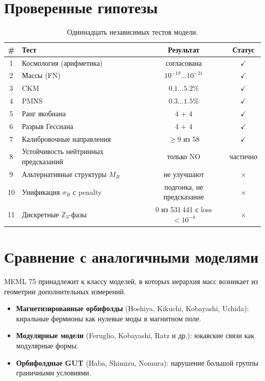 \documentclass[11pt,a4paper]{article}
\numberwithin{equation}{section}
\begin{document}
\section{Проверенные гипотезы}

\begin{table}[H]
\centering
\caption{Одиннадцать независимых тестов модели.}
\label{tab:tests}
\begin{tabular}{clcc}
\toprule
\# & Тест & Результат & Статус \\
\midrule
1 & Космология (арифметика)          & согласована & $\checkmark$ \\
2 & Массы (FN)                       & $10^{-19}\ldots10^{-21}$ & $\checkmark$ \\
3 & CKM                              & $0.1\ldots 5.2\%$ & $\checkmark$ \\
4 & PMNS                             & $0.3\ldots 1.5\%$ & $\checkmark$ \\
5 & Ранг якобиана                    & 4 + 4 & $\checkmark$ \\
6 & Разрыв Гессиана                  & 4 + 4 & $\checkmark$ \\
7 & Калибровочные направления        & $\ge 9$ из 58 & $\checkmark$ \\
8 & Устойчивость нейтринных предсказаний & только NO & частично \\
9 & Альтернативные структуры $M_R$   & не улучшают & $\times$ \\
10 & Унификация $\sigma_R$ с penalty & подгонка, не предсказание & $\times$ \\
11 & Дискретные $\mathbb{Z}_3$-фазы  & 0 из 531\,441 с loss $< 10^{-4}$ & $\times$ \\
\bottomrule
\end{tabular}
\end{table}

\section{Сравнение с аналогичными моделями}

MEML 75 принадлежит к классу моделей, в которых
иерархия масс возникает из геометрии дополнительных
измерений.

\begin{itemize}[leftmargin=1.5em,itemsep=0.15em]
\item \textbf{Магнетизированные орбифолды}
      (Hoshiya, Kikuchi, Kobayashi, Uchida):
      киральные фермионы как нулевые моды
      в магнитном поле.
\item \textbf{Модулярные модели} (Feruglio,
      Kobayashi, Ratz и др.): юкавские связи
      как модулярные формы.
\item \textbf{Орбифолдные GUT} (Haba, Shimizu,
      Nomura): нарушение большой группы
      граничными условиями.
\end{itemize}
\end{document}

